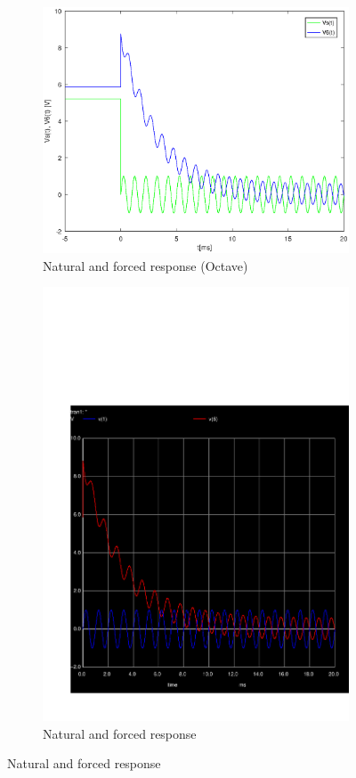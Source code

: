 \begin{figure}[H]
\begin{subfigure}{0.5\textwidth}
\includegraphics[width=\textwidth]{Solution.eps}
\caption{Natural and forced response (Octave)}
\label{fig:first}
\end{subfigure}
\begin{subfigure}{0.42\textwidth}
\includegraphics[width=\textwidth]{sim4.pdf}
\caption{Natural and forced response}
\label{fig:second}
\end{subfigure}

\end{figure}


